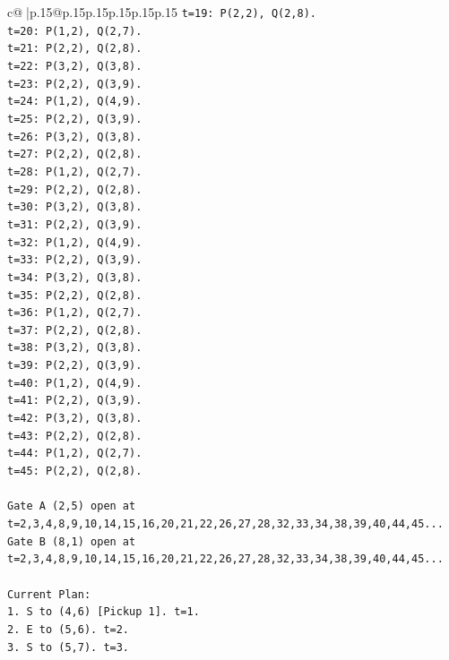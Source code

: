 \documentclass{article}
\begin{document}
{\begin{supertabular}{c@{$\;$}|p{.15\linewidth}@{}p{.15\linewidth}p{.15\linewidth}p{.15\linewidth}p{.15\linewidth}p{.15\linewidth}}
{{{\texttt{t=19: P(2,2), Q(2,8).} \\
\texttt{t=20: P(1,2), Q(2,7).} \\
\texttt{t=21: P(2,2), Q(2,8).} \\
\texttt{t=22: P(3,2), Q(3,8).} \\
\texttt{t=23: P(2,2), Q(3,9).} \\
\texttt{t=24: P(1,2), Q(4,9).} \\
\texttt{t=25: P(2,2), Q(3,9).} \\
\texttt{t=26: P(3,2), Q(3,8).} \\
\texttt{t=27: P(2,2), Q(2,8).} \\
\texttt{t=28: P(1,2), Q(2,7).} \\
\texttt{t=29: P(2,2), Q(2,8).} \\
\texttt{t=30: P(3,2), Q(3,8).} \\
\texttt{t=31: P(2,2), Q(3,9).} \\
\texttt{t=32: P(1,2), Q(4,9).} \\
\texttt{t=33: P(2,2), Q(3,9).} \\
\texttt{t=34: P(3,2), Q(3,8).} \\
\texttt{t=35: P(2,2), Q(2,8).} \\
\texttt{t=36: P(1,2), Q(2,7).} \\
\texttt{t=37: P(2,2), Q(2,8).} \\
\texttt{t=38: P(3,2), Q(3,8).} \\
\texttt{t=39: P(2,2), Q(3,9).} \\
\texttt{t=40: P(1,2), Q(4,9).} \\
\texttt{t=41: P(2,2), Q(3,9).} \\
\texttt{t=42: P(3,2), Q(3,8).} \\
\texttt{t=43: P(2,2), Q(2,8).} \\
\texttt{t=44: P(1,2), Q(2,7).} \\
\texttt{t=45: P(2,2), Q(2,8).} \\
\\ 
\texttt{Gate A (2,5) open at t=2,3,4,8,9,10,14,15,16,20,21,22,26,27,28,32,33,34,38,39,40,44,45...} \\
\texttt{Gate B (8,1) open at t=2,3,4,8,9,10,14,15,16,20,21,22,26,27,28,32,33,34,38,39,40,44,45...} \\
\\ 
\texttt{Current Plan:} \\
\texttt{1. S to (4,6) {[}Pickup 1{]}. t=1.} \\
\texttt{2. E to (5,6). t=2.} \\
\texttt{3. S to (5,7). t=3.} \\
}}}
\end{supertabular}}
\end{document}
